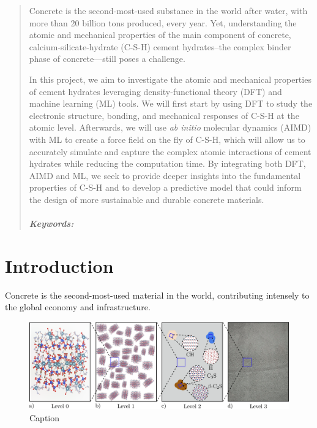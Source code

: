 \documentclass[11pt, titlepage, twoside, openright, usernames, dvipsnames]{thesis}
\theoremstyle{definition}
\theoremstyle{definition}
\begin{document}
\begin{abstract} 
Concrete is the second-most-used substance in the world after water, with more than 20 billion tons produced, every year. Yet, understanding the atomic and mechanical properties of the main component of concrete, calcium-silicate-hydrate (C-S-H) cement hydrates--the complex binder phase of concrete---still poses a challenge.
  
In this project, we aim to investigate the atomic and mechanical properties of cement hydrates leveraging density-functional theory (DFT) and machine learning (ML) tools. We will first start by using DFT to study the electronic structure, bonding, and mechanical responses of C-S-H  at the atomic level. Afterwards, we will use \emph{ab initio} molecular dynamics (AIMD) with ML to create a force field on the fly of C-S-H, which will allow us to accurately simulate and capture the complex atomic interactions of cement hydrates while reducing the computation time. By integrating both DFT, AIMD and ML, we seek to provide deeper insights into the fundamental properties of C-S-H and to develop a predictive model that could inform the design of more sustainable and durable concrete materials. \cite{Oey}
 \\
  \\
 \emph{\textbf{Keywords:}}
\end{abstract}

\tableofcontents
{}
\listoffigures
{}
\listoftables
{}


\mainbody
\chapter{Introduction}\label{Introduction}\glsresetall 
Concrete is the second-most-used material in the world, contributing intensely to the global economy and infrastructure.  

  \begin{figure}[H]
    \centering
    \includegraphics[width=1\textwidth]{levels.png}
    \caption{Caption}
    \label{fig:C-S-H}
  \end{figure}






\printglossary[type=\acronymtype, title={Abbreviations}]
\end{document}
